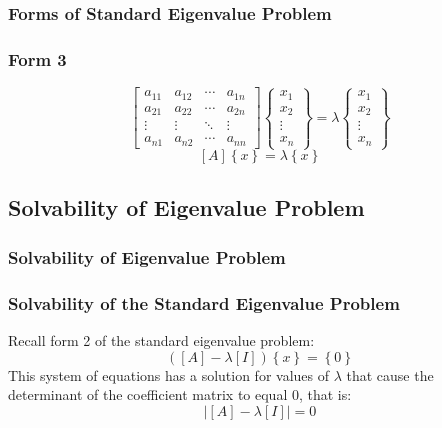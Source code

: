 \documentclass[fleqn]{ltx-talk} %
\newcommand{\sectionIIsubsectionItitle}{Forms of Standard Eigenvalue Problem}
\newcommand{\sectionIIsubsectionIItitle}{Solvability of Eigenvalue Problem}
\begin{document}
		\begin{frame}
				\frametitle{\sectionIIsubsectionItitle}
				\bigskip

				 \frametitle{Form 3}
  \begin{displaymath}
    \left[ \begin{array}{cccc}
        a_{11} & a_{12} & \cdots & a_{1n} \\
        a_{21} & a_{22} & \cdots & a_{2n} \\
        \vdots & \vdots & \ddots & \vdots \\
        a_{n1} & a_{n2} & \cdots & a_{nn}
      \end{array} \right]
    \left\{ \begin{array}{c}
        x_1 \\
        x_2 \\
        \vdots \\
        x_n
      \end{array} \right\} =
    \lambda
    \left\{ \begin{array}{c}
        x_1 \\
        x_2 \\
        \vdots \\
        x_n
      \end{array} \right\}
  \end{displaymath}
  \begin{displaymath}
    \left[ A \right] \left\{ x \right\} = \lambda \left\{ x \right\}
  \end{displaymath}
			
				\btVFill
			\end{frame}

		\subsection{\sectionIIsubsectionIItitle}\label{sectionIIsubsectionII}

			\begin{frame}
				\frametitle{\sectionIIsubsectionIItitle} \small
				\bigskip

				  \frametitle{Solvability of the Standard Eigenvalue Problem}
				  Recall form 2 of the standard eigenvalue problem:
				  \begin{displaymath}
				    \left( \left[A\right] - \lambda \left[ I \right] \right) \left\{ x \right\} = \left\{ 0 \right\}
				  \end{displaymath}
				  This system of equations has a solution for values of $\lambda$ that
				  cause the determinant of the coefficient matrix to equal 0, that is:
				  \begin{displaymath}
				    \left| \left[ A \right] - \lambda \left[ I \right] \right| = 0
				  \end{displaymath}

				\btVFill 
			\end{frame}	
\end{document}

